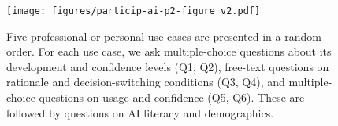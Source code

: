 \begin{figure}[hbtp]
    \centering
    \texttt{[image: figures/particip-ai-p2-figure\_v2.pdf]}
    \caption{Five professional or personal use cases are presented in a random order. For each use case, we ask multiple-choice questions about its development and confidence levels (Q1, Q2), free-text questions on rationale and decision-switching conditions (Q3, Q4), and multiple-choice questions on usage and confidence (Q5, Q6). These are followed by questions on AI literacy and demographics.}
    \label{fig:survey-flow}
\end{figure}

%